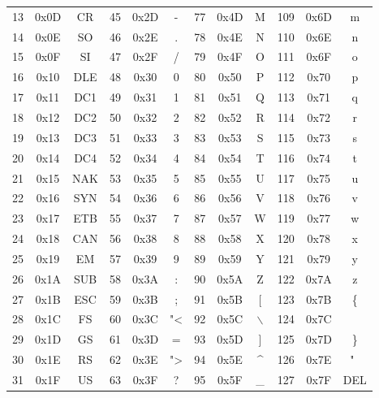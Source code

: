 \documentclass[a4paper]{article}
\begin{document}
\begin{figure}[H]
\begin{longtable}{|c|c|c||c|c|c||c|c|c||c|c|c|}
		13  & 0x0D &   CR    & 45  & 0x2D &    -    &	77 & 0x4D &    M    & 109 & 0x6D &     m      \\
		14  & 0x0E &   SO    & 46  & 0x2E &    .    &	78 & 0x4E &    N    & 110 & 0x6E &     n      \\
		15  & 0x0F &   SI    & 47  & 0x2F &    /    &	79 & 0x4F &    O    & 111 & 0x6F &     o      \\
		16  & 0x10 &   DLE   & 48  & 0x30 &    0    &	80 & 0x50 &    P    & 112 & 0x70 &     p      \\
		17  & 0x11 &   DC1   & 49  & 0x31 &    1    &	81 & 0x51 &    Q    & 113 & 0x71 &     q      \\
		18  & 0x12 &   DC2   & 50  & 0x32 &    2    &	82 & 0x52 &    R    & 114 & 0x72 &     r      \\
		19  & 0x13 &   DC3   & 51  & 0x33 &    3    &	83 & 0x53 &    S    & 115 & 0x73 &     s      \\
		20  & 0x14 &   DC4   & 52  & 0x34 &    4    &	84 & 0x54 &    T    & 116 & 0x74 &     t      \\
		21  & 0x15 &   NAK   & 53  & 0x35 &    5    &	85 & 0x55 &    U    & 117 & 0x75 &     u      \\
		22  & 0x16 &   SYN   & 54  & 0x36 &    6    &	86 & 0x56 &    V    & 118 & 0x76 &     v      \\
		23  & 0x17 &   ETB   & 55  & 0x37 &    7    &	87 & 0x57 &    W    & 119 & 0x77 &     w      \\
		24  & 0x18 &   CAN   & 56  & 0x38 &    8    &	88 & 0x58 &    X    & 120 & 0x78 &     x      \\
		25  & 0x19 &   EM    & 57  & 0x39 &    9    &	89 & 0x59 &    Y    & 121 & 0x79 &     y      \\
		26  & 0x1A &   SUB   & 58  & 0x3A &    :    &	90 & 0x5A &    Z    & 122 & 0x7A &     z      \\
		27  & 0x1B &   ESC   & 59  & 0x3B &    ;    &	91 & 0x5B &    [    & 123 & 0x7B &    \{      \\
		28  & 0x1C &   FS    & 60  & 0x3C &   "<    &	92 & 0x5C & $\backslash$ & 124 & 0x7C &       \\
		29  & 0x1D &   GS    & 61  & 0x3D &    =    &	93 & 0x5D &    ]    & 125 & 0x7D &    \}      \\
		30  & 0x1E &   RS    & 62  & 0x3E &   ">    &	94 & 0x5E &  \^{}   & 126 & 0x7E &     "~     \\
		31  & 0x1F &   US    & 63  & 0x3F &    ?    &	95 & 0x5F &   \_    & 127 & 0x7F &    DEL     \\ 
		\hline
	\end{longtable}
\end{figure}


\end{document}

